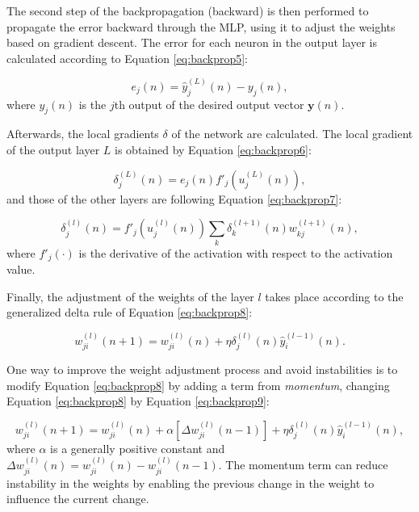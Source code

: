%

The second step of the backpropagation (backward) is then performed to propagate the error backward through the MLP, using it to adjust the weights based on gradient descent. The error for each neuron in the output layer is calculated according to Equation \ref{eq:backprop5}: 

\begin{equation}
    \label{eq:backprop5}
    e_j (n) = \hat{y}^{(L)}_j(n) - y_j (n),
\end{equation}
where $y_j (n)$ is the $j$th output of the desired output vector $\mathbf{y}(n)$.

Afterwards, the local gradients $\delta$ of the network are calculated. The local gradient of the output layer $L$ is obtained by Equation \ref{eq:backprop6}:

\begin{equation}
    \label{eq:backprop6}
    \delta_j^{(L)} (n) = e_j(n) {f}'_j (u_j^{(L)}(n)),
\end{equation}
and those of the other layers are following Equation \ref{eq:backprop7}:

\begin{equation}
    \label{eq:backprop7}
    \delta_j^{(l)} (n) = {f}'_j (u_j^{(l)}(n)) \sum_k \delta_k^{(l+1)} (n) w_{kj}^{(l+1)}(n),
\end{equation}
where ${f}'_j(\cdot)$ is the derivative of the activation with respect to the activation value.

Finally, the adjustment of the weights of the layer $l$ takes place according to the generalized delta rule of Equation \ref{eq:backprop8}:

\begin{equation}
    \label{eq:backprop8}
    w_{ji}^{(l)} (n+1) = w_{ji}^{(l)}(n) + \eta \delta_j^{(l)}(n) \hat{y}_i^{(l-1)} (n).
\end{equation}

One way to improve the weight adjustment process and avoid instabilities is to modify Equation \ref{eq:backprop8} by adding a term from \textit{momentum}, changing Equation \ref{eq:backprop8} by Equation \ref{eq:backprop9}:

\begin{equation}
\label{eq:backprop9}
    w_{ji}^{(l)} (n+1) = w_{ji}^{(l)}(n) + \alpha[\Delta w_{ji}^{(l)}(n-1)] + \eta \delta_j^{(l)}(n) \hat{y}_i^{(l-1)} (n),
\end{equation}
where $\alpha$ is a generally positive constant and $\Delta w_{ji}^{(l)}(n) = w_{ji}^{(l)}(n) - w_{ji}^{(l)}(n-1)$. The momentum term can reduce instability in the weights by enabling the previous change in the weight to influence the current change.

